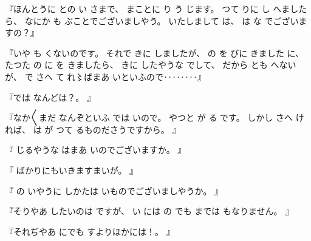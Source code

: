 %
『ほんとうに
との
い
さまで、
%
まことに
り
う
じます。
%
つて
りに
し
へましたら、
%
なにか
も
ぶことでございましやう。
%
いたしまして
は、
%
は
な
でございますの？』

%
『いや
も
くないのです。
%
それで
きに
しましたが、
%
の
を
びに
きました
に、
%
たつた
の
に
を
きましたら、
%
きに
したやうな
でして、
%
だから%
とも
へないが、
%
で
さへ
て
れ〻ばまあ
いといふので‥‥‥‥』

%
『では
なんどは？。
』

%
『なか〳〵まだ
なんぞといふ
では
いので。
%
やつと
が
る
です。
%
しかし
さへ
ければ、
%
は
が
つて
るものださうですから。
』

%
『
じるやうな
はまあ
いのでございますか。
』

%
『
ばかりにもいきますまいが。
』

%
『
の
いやうに
しかたは
いものでございましやうか。
』

%
『そりやあ
したいのは
ですが、
%
い
には
の
%
でも
までは
もなりません。
』

%
『それぢやあ
にでも
すよりほかには！。
』


